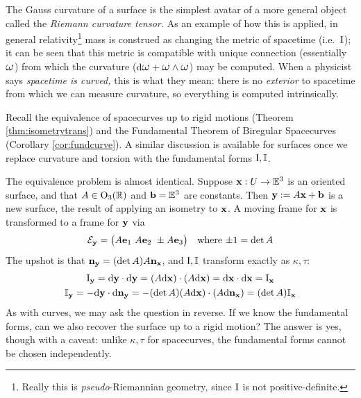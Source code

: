
The Gauss curvature of a surface is the simplest avatar of a more general object called the \emph{Riemann curvature tensor.} As an example of how this is applied, in general relativity\footnote{Really this is \emph{pseudo}-Riemannian geometry, since $\mathrm{I}$ is not positive-definite.} mass is construed as changing the metric of spacetime (i.e.\ $\mathrm{I}$); it can be seen that this metric is compatible with unique connection (essentially $\lomega$) from which the curvature ($\D\lomega+\lomega\wedge\lomega$) may be computed. When a physicist says \emph{spacetime is curved,} this is what they mean: there is no \emph{exterior} to spacetime from which we can measure curvature, so everything is computed intrinsically.




Recall the equivalence of spacecurves up to rigid motions (Theorem \ref{thm:isometrytrans}) and the Fundamental Theorem of Biregular Spacecurves (Corollary \ref{cor:fundcurve}). A similar discussion is available for surfaces once we replace curvature and torsion with the fundamental forms $\mathrm{I},\mathbb{I}$.\smallbreak

The equivalence problem is almost identical. Suppose ${\mathbf{x}}:U\to\mathbb{E}^3$ is an oriented surface, and that $A\in\mathrm{O}_3(\mathbb{R})$ and ${\mathbf{b}}=\mathbb{E}^3$ are constants. Then ${\mathbf{y}}:=A{\mathbf{x}}+{\mathbf{b}}$ is a new surface, the result of applying an isometry to ${\mathbf{x}}$. A moving frame for ${\mathbf{x}}$ is transformed to a frame for ${\mathbf{y}}$ via
\[
	\mathcal{E}_{\mathbf{y}}=\bigl(A{\mathbf{e}}_1\ A{\mathbf{e}}_2\ \pm A{\mathbf{e}}_3\bigr) \quad\text{where $\pm 1=\det A$}
\]
The upshot is that ${\mathbf{n}}_{\mathbf{y}}=(\det A)A{\mathbf{n}}_{\mathbf{x}}$, and $\mathrm{I},\mathbb{I}$ transform exactly as $\kappa,\tau$:
\begin{gather*}
\mathrm{I}_{\mathbf{y}}=\mathrm{d}{\mathbf{y}}\cdot\mathrm{d}{\mathbf{y}}=(A\mathrm{d}{\mathbf{x}})\cdot (A\mathrm{d}{\mathbf{x}}) = \mathrm{d}{\mathbf{x}}\cdot\mathrm{d}{\mathbf{x}}=\mathrm{I}_{\mathbf{x}}\\
\mathbb{I}_{\mathbf{y}}=-\mathrm{d}{\mathbf{y}}\cdot\mathrm{d}{\mathbf{n}}_{\mathbf{y}}=-(\det A)(A\mathrm{d}{\mathbf{x}})\cdot (A\mathrm{d}{\mathbf{n}}_{\mathbf{x}}) = (\det A)\mathbb{I}_{\mathbf{x}}
\end{gather*}
As with curves, we may ask the question in reverse. If we know the fundamental forms, can we also recover the surface up to a rigid motion? The answer is yes, though with a caveat: unlike $\kappa,\tau$ for spacecurves, the fundamental forms cannot be chosen independently.

